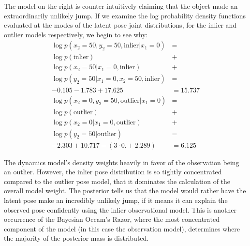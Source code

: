 The model on the right is counter-intuitively claiming that the object made an extraordinarily unlikely jump.
If we examine the log probability density functions evaluated at the modes of the latent pose joint distributions, for the inlier and outlier models respectively, we begin to see why:
\begin{align*}
  \log p(x_2 = 50, y_2 = 50, \mathrm{inlier} | x_1 = 0) &= \\
  \log p(\mathrm{inlier}) &+ \\
  \log p(x_2 = 50 | x_1 = 0, \mathrm{inlier}) &+ \\
  \log p(y_2 = 50 | x_1 = 0, x_2 = 50, \mathrm{inlier}) &= \\
  -0.105 - 1.783 + 17.625 &= 15.737 \\
  \log p(x_2 = 0, y_2 = 50, \mathrm{outlier} | x_1 = 0) &= \\
  \log p(\mathrm{outlier}) &+ \\
  \log p(x_2 = 0 | x_1 = 0, \mathrm{outlier}) &+ \\
  \log p(y_2 = 50 | \mathrm{outlier}) &= \\
  -2.303 + 10.717 - (3\cdot0. + 2.289) &= 6.125
\end{align*}

The dynamics model's density weights heavily in favor of the observation being an outlier.
However, the inlier pose distribution is so tightly concentrated compared to the outlier pose model, that it dominates the calculation of the overall model weight.
The posterior tells us that the model would rather have the latent pose make an incredibly unlikely jump, if it means it can explain the observed pose confidently using the inlier observational model.
This is another occurrence of the Bayesian Occam's Razor, where the most concentrated component of the model (in this case the observation model), determines where the majority of the posterior mass is distributed.

\raggedbottom

\pagebreak

\flushbottom

